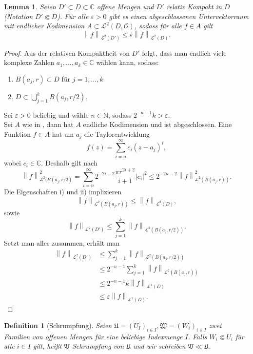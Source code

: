 \documentclass[11pt,a4paper]{scrartcl}
\theoremstyle{thm}
\newtheorem{lemma}{Lemma}[section]
\theoremstyle{def}
\newtheorem{defi}{Definition}[section]
\theoremstyle{remark}
\newcommand{\norm}[1]{\left\lVert#1\right\rVert}
\begin{document}
\begin{lemma}
Seien $D' \subset D\subset \mathbb{C}$ offene Mengen und $D'$ relativ Kompakt in $D$ (Notation $D'\Subset D$). Für alle $\varepsilon >0$ gibt es einen abgeschlossenen Untervektorraum mit endlicher Kodimension $A\subset \mathcal{L}^2(D,\mathcal{O})$, sodass für alle $f\in A$ gilt
\[
\norm{f}_{\mathcal{L}^2(D')} \leq \varepsilon \norm{f}_{\mathcal{L}^2(D)}.
\]
\end{lemma}
\begin{proof}
Aus der relativen Kompaktheit von $D'$ folgt, dass man endlich viele komplexe Zahlen $a_1,\ldots,a_k\in\mathbb{C}$ wählen kann, sodass:
\begin{enumerate}
\item $B(a_j,r)\subset D$ für $j=1,\ldots,k$
\item  $D\subset\bigcup_{j=1}^k B(a_j,r/2)$.
\end{enumerate}
Sei $\varepsilon>0$ beliebig und wähle $n\in\mathbb{N}$, sodass $2^{-n-1}k>\varepsilon$.\\
Sei $A$ wie in , dann hat $A$ endliche Kodimension und ist abgeschlossen. Eine Funktion $f\in A$ hat um $a_j$ die Taylorentwicklung 
\[
f(z)=\sum_{i=n}^{\infty} c_i(z-a_j)^i,
\]
wobei $c_i\in\mathbb{C}$. Deshalb gilt nach 
\[
\norm{f}_{\mathcal{L}^2(B(a_j,r/2)}^2=\sum_{i=n}^{\infty}2^{-2i-2}\frac{\pi r^{2i+2}}{i+1}|c_i|^2\leq 2^{-2n-2}\norm{f}_{\mathcal{L}^2(B(a_j,r))}^2.
\]
Die Eigenschaften i) und ii) implizieren
\[
\norm{f}_{\mathcal{L}^2(B(a_j,r))}\leq \norm{f}_{\mathcal{L}^2(D)},
\]
sowie
\[
\norm{f}_{\mathcal{L}^2(D')}\leq \sum_{j=1}^{k}\norm{f}_{\mathcal{L}^2(B(a_j,r/2))}.
\]
Setzt man alles zusammen, erhält man
\begin{align*}
    \norm{f}_{\mathcal{L}^2(D')} & \leq \sum_{j=1}^{k}\norm{f}_{\mathcal{L}^2(B(a_j,r/2))}\\
                                &\leq 2^{-n-1}\sum_{j=1}^{k}\norm{f}_{\mathcal{L}^2(B(a_j,r))}\\
                                &\leq 2^{-n-1}k \norm{f}_{\mathcal{L}^2(D)}\\
                                &\leq \varepsilon \norm{f}_{\mathcal{L}^2(D)}.
\end{align*}


\end{proof}

\begin{defi}[Schrumpfung]
Seien $\mathfrak{U}=(U_I)_{i\in I},\mathfrak{W}=(W_i)_{i\in I}$ zwei Familien von offenen Mengen für eine beliebige Indexmenge $I$. Falls $W_i\Subset U_i$ für alle $i\in I$ gilt, heißt $\mathfrak{V}$ \emph{Schrumpfung} von $\mathfrak{U}$ und wir schreiben $\mathfrak{V}\ll\mathfrak{U}$.
\end{defi}
\end{document}
